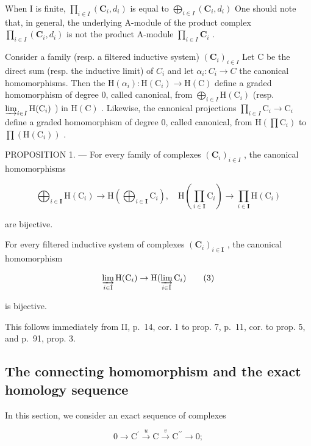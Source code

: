 When I is finite, \(\prod_{i\in I}(\mathbf{C}_{i},d_{i})\) is equal to \(\bigoplus_{i\in I}(\mathbf{C}_{i},d_{i})\) One should note that, in general, the underlying A-module of the product complex \(\prod_{i\in I}(\mathbf{C}_{i},d_{i})\) is not the product A-module \(\prod_{i\in I}\mathbf{C}_{i}\) .

Consider a family (resp. a filtered inductive system) \((\mathbf{C}_i)_{i\in I}\) Let C be the direct sum (resp. the inductive limit) of \(C_i\) and let \(\alpha_{i}:C_{i}\to C\) the canonical homomorphisms. Then the \(\mathrm{H}(\alpha_{i}): \mathrm{H}(\mathrm{C}_{i})\to \mathrm{H}(\mathrm{C})\) define a graded homomorphism of degree 0, called canonical, from \(\bigoplus_{i\in I}\mathrm{H}(\mathrm{C}_{i})\) (resp. \(\varinjlim_{i\in I}\mathrm{H}(\mathrm{C}_{i})\) ) in \(\mathrm{H}(\mathrm{C})\) . Likewise, the canonical projections \(\prod_{i\in I}\mathrm{C}_{i}\to \mathrm{C}_{i}\) define a graded homomorphism of degree 0, called canonical, from \(\mathrm{H}(\prod \mathrm{C}_i)\) to \(\prod (\mathrm{H}(\mathrm{C}_i))\) .

PROPOSITION 1. --- For every family of complexes \((\mathbf{C}_{i})_{i\in I}\) , the canonical homomorphisms

\[
\bigoplus_ {i \in \mathbf {I}} \mathrm{H} (\mathrm{C} _ {i}) \rightarrow \mathrm{H} \left(\bigoplus_ {i \in \mathbf {I}} \mathrm{C} _ {i}\right), \quad \mathrm{H} \left(\prod_ {i \in \mathbf {I}} \mathrm{C} _ {i}\right)\rightarrow \prod_ {i \in \mathbf {I}} \mathrm{H} (\mathrm{C} _ {i})\tag{2}
\]

are bijective.

For every filtered inductive system of complexes \((\mathbf{C}_{i})_{i\in\mathbf{I}}\) , the canonical homomorphism

\[
\varinjlim_ {i \in \mathrm{I}} \mathrm{H} (\mathrm{C} _ {i}) \to \mathrm{H} (\varinjlim_ {i \in \mathrm{I}} \mathrm{C} _ {i})\tag{3}
\]

is bijective.

This follows immediately from II, p.~14, cor. 1 to prop. 7, p.~11, cor. to prop. 5, and p.~91, prop. 3.

\subsection{The connecting homomorphism and the exact homology sequence}

In this section, we consider an exact sequence of complexes

\[
0 \longrightarrow \mathrm{C} ^ {\prime} \stackrel {u} {\longrightarrow} \mathrm{C} \stackrel {v} {\longrightarrow} \mathrm{C} ^ {\prime \prime} \longrightarrow 0;
\]

